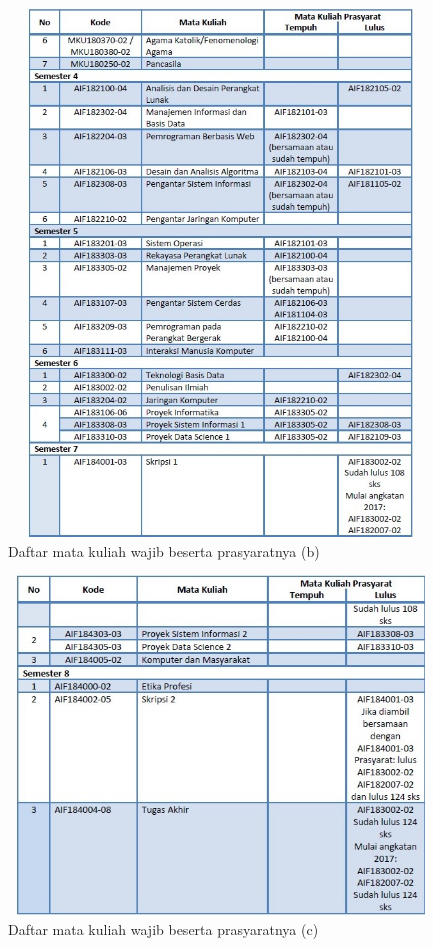 \begin{figure}[H]
    \centering
    \includegraphics[width=12cm, height=14cm]{Gambar/Prasyarat MK Wajib 2.jpg}
    \caption{Daftar mata kuliah wajib beserta prasyaratnya (b)}
    \label{fig:gambar9}
\end{figure}

\begin{figure}[H]
    \centering
    \includegraphics[width=12cm, height=9cm]{Gambar/Prasyarat MK Wajib 3.jpg}
    \caption{Daftar mata kuliah wajib beserta prasyaratnya (c)}
    \label{fig:gambar10}
\end{figure}



